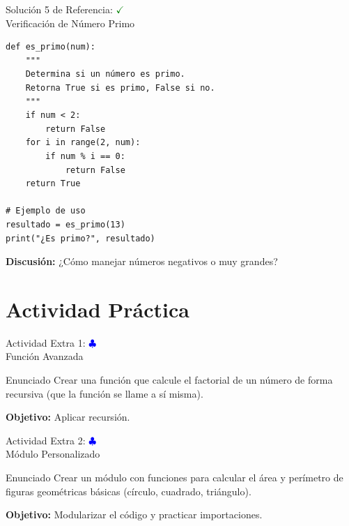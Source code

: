 \documentclass[10pt]{beamer}
\begin{document}
\begin{solutionblock}
\begin{frame}[fragile]{Solución 5 de Referencia: \hfill \textcolor{green}{$\checkmark$} \\ 
Verificación de Número Primo}
\begin{verbatim}
def es_primo(num):
    """
    Determina si un número es primo.
    Retorna True si es primo, False si no.
    """
    if num < 2:
        return False
    for i in range(2, num):
        if num % i == 0:
            return False
    return True

# Ejemplo de uso
resultado = es_primo(13)
print("¿Es primo?", resultado)
\end{verbatim}
\textbf{Discusión:} ¿Cómo manejar números negativos o muy grandes?
\end{frame}
\end{solutionblock}

\section{Actividad Práctica}

\begin{frame}{Actividad Extra 1: \hfill \textcolor{blue}{$\clubsuit$} \\
Función Avanzada}
  \begin{block}{Enunciado}
    Crear una función que calcule el factorial de un número de forma recursiva (que la función se llame a sí misma).
  \end{block}
  \textbf{Objetivo:} Aplicar recursión.
\end{frame}

\begin{frame}{Actividad Extra 2: \hfill \textcolor{blue}{$\clubsuit$} \\
Módulo Personalizado}
  \begin{block}{Enunciado}
    Crear un módulo con funciones para calcular el área y perímetro de figuras geométricas básicas (círculo, cuadrado, triángulo).
  \end{block}
  \textbf{Objetivo:} Modularizar el código y practicar importaciones.
\end{frame}
\end{document}
